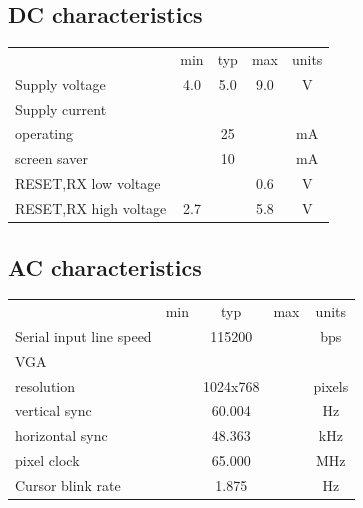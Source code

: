 \documentclass{article}
\newcommand{\heavyline}{\specialrule{1pt}{1pt}{1pt}}
\begin{document}
\subsection{DC characteristics}
\vspace{10 pt}
{\renewcommand{\arraystretch}{1.2}%

\begin{tabularx}{\linewidth}{Xcccc}
\heavyline
& min & typ & max & units \\ \heavyline

Supply voltage & 4.0 & 5.0 & 9.0 & V \\ \hline

Supply current & & & & \\
\hspace{10pt} operating & & 25 & & mA \\
\hspace{10pt} screen saver & & 10 & & mA \\ \hline

RESET,RX low voltage & & & 0.6 & V \\ \hline
RESET,RX high voltage & 2.7 &   & 5.8 & V \\ \hline
\end{tabularx}}
\vspace{10 pt}

\subsection{AC characteristics}
\vspace{10 pt}

{\renewcommand{\arraystretch}{1.2}%
\begin{tabularx}{\linewidth}{Xcccc}
\heavyline
& min & typ & max & units \\ \heavyline

Serial input line speed & & 115200 & & bps \\ \hline

VGA & & & & \\
\hspace{10pt} resolution & & 1024x768 & & pixels \\
\hspace{10pt} vertical sync & & 60.004 & & Hz \\
\hspace{10pt} horizontal sync & & 48.363 & & kHz \\
\hspace{10pt} pixel clock & & 65.000 & & MHz \\ \hline

Cursor blink rate & & 1.875 & & Hz \\ \hline
\end{tabularx}}
\vspace{10 pt}
\end{document}
